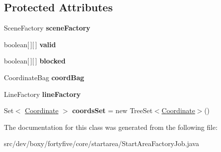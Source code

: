\subsection*{Protected Attributes}
\begin{DoxyCompactItemize}
\item 
\hypertarget{classdev_1_1boxy_1_1fortyfive_1_1core_1_1startarea_1_1_start_area_factory_job_a1025efd7c509b94e6141df6d447a7566}{
SceneFactory {\bfseries sceneFactory}}
\label{d4/d36/classdev_1_1boxy_1_1fortyfive_1_1core_1_1startarea_1_1_start_area_factory_job_a1025efd7c509b94e6141df6d447a7566}

\item 
\hypertarget{classdev_1_1boxy_1_1fortyfive_1_1core_1_1startarea_1_1_start_area_factory_job_af099ea41b4735f0b785802ac29f75c26}{
boolean\mbox{[}$\,$\mbox{]}\mbox{[}$\,$\mbox{]} {\bfseries valid}}
\label{d4/d36/classdev_1_1boxy_1_1fortyfive_1_1core_1_1startarea_1_1_start_area_factory_job_af099ea41b4735f0b785802ac29f75c26}

\item 
\hypertarget{classdev_1_1boxy_1_1fortyfive_1_1core_1_1startarea_1_1_start_area_factory_job_aeaf0256f12fedd03c9d3ea79a8fecca3}{
boolean\mbox{[}$\,$\mbox{]}\mbox{[}$\,$\mbox{]} {\bfseries blocked}}
\label{d4/d36/classdev_1_1boxy_1_1fortyfive_1_1core_1_1startarea_1_1_start_area_factory_job_aeaf0256f12fedd03c9d3ea79a8fecca3}

\item 
\hypertarget{classdev_1_1boxy_1_1fortyfive_1_1core_1_1startarea_1_1_start_area_factory_job_a1180494e75c7e367758300203fcbe7be}{
CoordinateBag {\bfseries coordBag}}
\label{d4/d36/classdev_1_1boxy_1_1fortyfive_1_1core_1_1startarea_1_1_start_area_factory_job_a1180494e75c7e367758300203fcbe7be}

\item 
\hypertarget{classdev_1_1boxy_1_1fortyfive_1_1core_1_1startarea_1_1_start_area_factory_job_a9898fe358f67677109c46c89fcc729ed}{
LineFactory {\bfseries lineFactory}}
\label{d4/d36/classdev_1_1boxy_1_1fortyfive_1_1core_1_1startarea_1_1_start_area_factory_job_a9898fe358f67677109c46c89fcc729ed}

\item 
\hypertarget{classdev_1_1boxy_1_1fortyfive_1_1core_1_1startarea_1_1_start_area_factory_job_a1a03f6ae79981747490eac7ef80a10c9}{
Set$<$ \hyperlink{classdev_1_1boxy_1_1fortyfive_1_1core_1_1startarea_1_1_coordinate}{Coordinate} $>$ {\bfseries coordsSet} = new TreeSet$<$\hyperlink{classdev_1_1boxy_1_1fortyfive_1_1core_1_1startarea_1_1_coordinate}{Coordinate}$>$()}
\label{d4/d36/classdev_1_1boxy_1_1fortyfive_1_1core_1_1startarea_1_1_start_area_factory_job_a1a03f6ae79981747490eac7ef80a10c9}

\end{DoxyCompactItemize}


The documentation for this class was generated from the following file:\begin{DoxyCompactItemize}
\item 
src/dev/boxy/fortyfive/core/startarea/StartAreaFactoryJob.java\end{DoxyCompactItemize}
